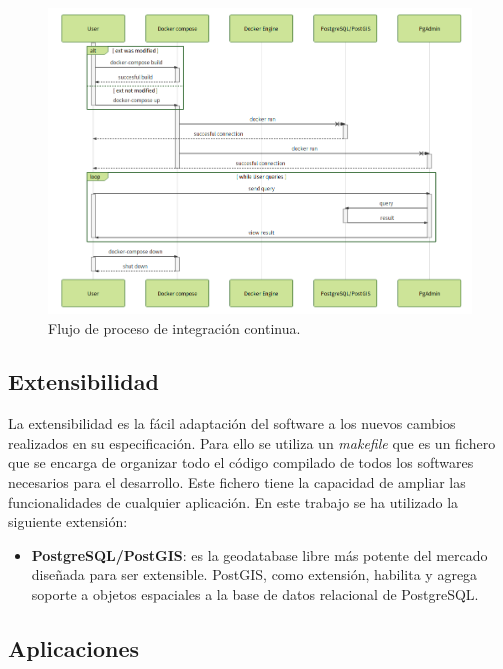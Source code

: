 \begin{figure}
\begin{center}
\includegraphics[width=\textwidth]{Metodologia/Figs/ci.png}
\caption{Flujo de proceso de integración continua. \label{fig:ci}}
\end{center}
\end{figure}


\subsection{Extensibilidad}\label{subsec:exten}

La extensibilidad es la fácil adaptación del software a los nuevos cambios realizados en su especificación. Para ello se utiliza un \textit{makefile} que es un fichero que se encarga de organizar todo el código compilado de todos los softwares necesarios para el desarrollo. Este fichero tiene la capacidad de ampliar las funcionalidades de cualquier aplicación. En este trabajo se ha utilizado la siguiente extensión:

\begin{itemize}
\item\textbf{PostgreSQL/PostGIS}: es la geodatabase libre más potente del mercado diseñada para ser extensible. PostGIS, como extensión, habilita y agrega soporte a objetos espaciales a la base de datos relacional de PostgreSQL.
\end{itemize}


\subsection{Aplicaciones}\label{subsec:aplic}

